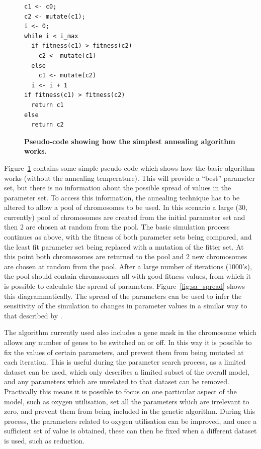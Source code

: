 \begin{figure}
\begin{verbatim}
c1 <- c0;
c2 <- mutate(c1);
i <- 0;
while i < i_max
  if fitness(c1) > fitness(c2)
    c2 <- mutate(c1)
  else
    c1 <- mutate(c2)
  i <- i + 1
if fitness(c1) > fitness(c2)
  return c1
else
  return c2
\end{verbatim}
\caption[Pseudo-code showing how the simplest annealing algorithm works.]{{\bf Pseudo-code showing how the simplest annealing algorithm works.}
\label{fig:sa_code}}
\end{figure}

Figure~\ref{fig:sa_code} contains some simple pseudo-code which shows how the basic algorithm works (without the annealing temperature). This will provide a ``best'' parameter set, but there is no information about the possible spread of values in the parameter set. To access this information, the annealing technique has to be altered to allow a pool of chromosomes to be used. In this scenario a large (30, currently) pool of chromosomes are created from the initial parameter set and then 2
are chosen at random from the pool. The basic simulation process continues as above, with the fitness of both parameter sets being compared, and the least fit parameter set being replaced with a mutation of the fitter set. At this point both chromosomes are returned to the pool and 2 new chromosomes are chosen at random from the pool. After a large number of iterations (1000's), the pool should contain chromosomes all with good fitness values, from which it is possible to calculate the spread of parameters. Figure~\ref{fig:sa_spread} shows this diagrammatically. The spread of the parameters can be used to infer the sensitivity of the simulation to changes in parameter values in a similar way to that described by \citet{Toni2009}.

The algorithm currently used also includes a gene mask in the chromosome which allows any number of genes to be switched on or off. In this way it is possible to fix the values of certain parameters, and prevent them from being mutated at each iteration. This is useful during the parameter search process, as a limited dataset can be used, which only describes a limited subset of the overall model, and any parameters which are unrelated to that dataset can be removed. Practically this means it is possible to focus on one particular aspect of the model, such as oxygen utilisation, set all the parameters which are irrelevant to zero, and prevent them from being included in the genetic algorithm. During this process, the parameters related to oxygen utilisation can be improved, and once a sufficient set of value is obtained, these can then be fixed when a different dataset is used, such as \cNO \space reduction.

